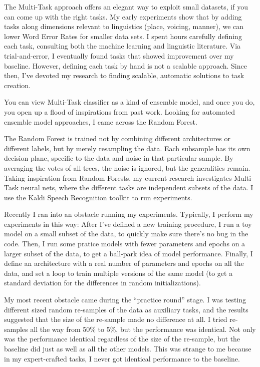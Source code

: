 \documentclass[12pt,a4paper]{article}
\begin{document}
The Multi-Task approach offers an elegant way to exploit small datasets, if you can come up with the right tasks. My early experiments show that by adding tasks along dimensions relevant to linguistics (place, voicing, manner), we can lower Word Error Rates for smaller data sets. I spent hours carefully defining each task, consulting both the machine learning and linguistic literature. Via trial-and-error, I eventually found tasks that showed improvement over my baseline. However, defining each task by hand is not a scalable approach. Since then, I've devoted my research to finding scalable, automatic solutions to task creation.

You can view Multi-Task classifier as a kind of ensemble model, and once you do, you open up a flood of inspirations from past work. Looking for automated ensemble model approaches, I came across the Random Forest.

The Random Forest is trained not by combining different architectures or different labels, but by merely resampling the data. Each subsample has its own decision plane, specific to the data and noise in that particular sample. By averaging the votes of all trees, the noise is ignored, but the generalities remain. Taking inspiration from Random Forests, my current research investigates Multi-Task neural nets, where the different tasks are independent subsets of the data. I use the Kaldi Speech Recognition toolkit to run experiments.

Recently I ran into an obstacle running my experiments. Typically, I perform my experiments in this way: After I've defined a new training procedure, I run a toy model on a small subset of the data, to quickly make sure there's no bug in the code. Then, I run some pratice models with fewer parameters and epochs on a larger subset of the data, to get a ball-park idea of model performance. Finally, I define an architecture with a real number of parameters and epochs on all the data, and set a loop to train multiple versions of the same model (to get a standard deviation for the differences in random initializations).

My most recent obstacle came during the ``practice round'' stage. I was testing different sized random re-samples of the data as auxiliary tasks, and the results suggested that the size of the re-sample made no difference at all. I tried re-samples all the way from 50\% to 5\%, but the performance was identical. Not only was the performance identical regardless of the size of the re-sample, but the baseline did just as well as all the other models. This was strange to me because in my expert-crafted tasks, I never got identical performance to the baseline.
\end{document}
